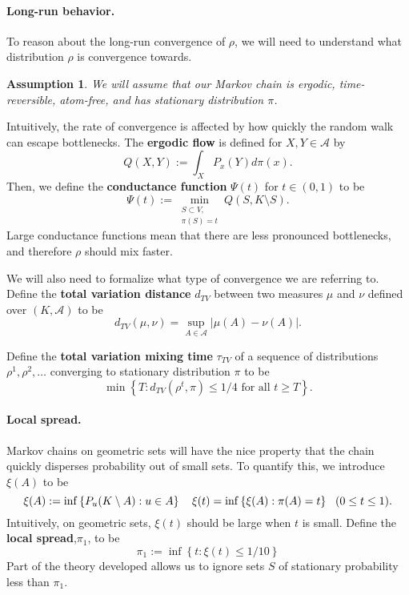 \documentclass{article}
\newcommand{\abs}[1]{\left \lvert #1 \right \rvert}
\newcommand{\set}[1]{\left\{#1\right\}}
\newcommand{\A}{\mathcal{A}}
\theoremstyle{alden}
\newtheorem{assumption}{Assumption}
\theoremstyle{aldenthm}
\theoremstyle{definition}
\theoremstyle{remark}
\begin{document}
\paragraph{Long-run behavior.}

To reason about the long-run convergence of $\rho$, we will need to understand what distribution $\rho$ is convergence towards.

\begin{assumption}
	\label{asmp: long_run_behavior}
	We will assume that our Markov chain is ergodic, time-reversible, atom-free, and has stationary distribution $\pi$.
\end{assumption}

Intuitively, the rate of convergence is affected by how quickly the random walk can escape bottlenecks. The \textbf{ergodic flow} is defined for $X, Y \in \A$ by
\begin{equation*}
Q(X,Y) := \int_X P_x(Y) d \pi(x).
\end{equation*}
Then, we define the \textbf{conductance function} $\Psi(t)$ for $t \in (0,1)$ to be
\begin{equation*}
\Psi(t) := \min_{ \substack{S \subset V, \\ \pi(S) = t} } Q(S, K \setminus S).
\end{equation*}
Large conductance functions mean that there are less pronounced bottlenecks, and therefore $\rho$ should mix faster. 

We will also need to formalize what type of convergence we are referring to. Define the \textbf{total variation distance} $d_{TV}$ between two measures $\mu$ and $\nu$ defined over $(K,\mathcal{A})$ to be
\begin{equation*}
d_{TV}(\mu, \nu) = \sup_{A \in \mathcal{A}} \abs{\mu(A) - \nu(A)}.
\end{equation*}

Define the \textbf{total variation mixing time} $\tau_{TV}$ of a sequence of distributions $\rho^1, \rho^2, \ldots$ converging to stationary distribution $\pi$ to be 
\begin{equation*}
\min \set{T: d_{TV}(\rho^t, \pi) \leq 1/4 \text{ for all } t \geq T}.
\end{equation*} 

\paragraph{Local spread.}
Markov chains on geometric sets will have the nice property that the chain quickly disperses probability out of small sets. To quantify this, we introduce $\xi(A)$ to be
\begin{equation*}
\xi(A) := \inf \set{P_u(K \setminus A): u \in A} \\ ~~~ \xi(t) = \inf \set{\xi(A): \pi(A) = t} ~~ (0 \leq t \leq 1).
\end{equation*}
Intuitively, on geometric sets, $\xi(t)$ should be large when $t$ is small. Define the \textbf{local spread},$\pi_1$, to be 
\begin{equation*}
\pi_1 := \inf \set{t: \xi(t) \leq 1/10}
\end{equation*}
Part of the theory developed allows us to ignore sets $S$ of stationary probability less than $\pi_1$. 
\end{document}
